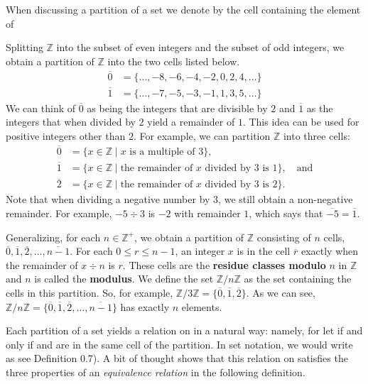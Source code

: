 \documentclass[11pt,oneside]{article}
\begin{document}
\begin{BookBody}

When discussing a partition of a set  we denote by  the cell containing the element  of 

 Splitting $\mathbb{Z}$ into the subset of even integers and the subset of odd integers, we obtain a partition of $\mathbb{Z}$ into the two cells listed below.
\[
\begin{aligned}
\overline{0}&=\{\ldots,-8,-6,-4,-2,0,2,4,\ldots\}\\
\overline{1}&=\{\ldots,-7,-5,-3,-1,1,3,5,\ldots\}
\end{aligned}
\]
We can think of $\overline{0}$ as being the integers that are divisible by $2$ and $\overline{1}$ as the integers that when divided by $2$ yield a remainder of $1$. This idea can be used for positive integers other than $2$. For example, we can partition $\mathbb{Z}$ into three cells:
\[
\begin{aligned}
\overline{0}&=\{x\in\mathbb{Z}\mid x\text{ is a multiple of }3\},\\
\overline{1}&=\{x\in\mathbb{Z}\mid\text{the remainder of }x\text{ divided by }3\text{ is }1\},\quad\text{and}\\
\overline{2}&=\{x\in\mathbb{Z}\mid\text{the remainder of }x\text{ divided by }3\text{ is }2\}.
\end{aligned}
\]
Note that when dividing a negative number by $3$, we still obtain a non-negative remainder. For example, $-5\div3$ is $-2$ with remainder $1$, which says that $\overline{-5}=\overline{1}$.

Generalizing, for each $n\in\mathbb{Z}^{+}$, we obtain a partition of $\mathbb{Z}$ consisting of $n$ cells, $\overline{0},\overline{1},\overline{2},\ldots,\overline{n-1}$. For each $0\leq r\leq n-1$, an integer $x$ is in the cell $\overline{r}$ exactly when the remainder of $x\div n$ is $r$. These cells are the \textbf{residue classes modulo} $n$ in $\mathbb{Z}$ and $n$ is called the \textbf{modulus}. We define the set $\mathbb{Z}/n\mathbb{Z}$ as the set containing the cells in this partition. So, for example, $\mathbb{Z}/3\mathbb{Z}=\{\overline{0},\overline{1},\overline{2}\}$. As we can see, $\mathbb{Z}/n\mathbb{Z}=\{\overline{0},\overline{1},\overline{2},\ldots,\overline{n-1}\}$ has exactly $n$ elements.\BookEnd{\blacktriangle}

Each partition of a set  yields a relation  on  in a natural way: namely, for  let  if and only if  and  are in the same cell of the partition. In set notation, we would write  as see Definition 0.7). A bit of thought shows that this relation  on  satisfies the three properties of an\textit{ equivalence relation} in the following definition.


\end{BookBody}
\end{document}
